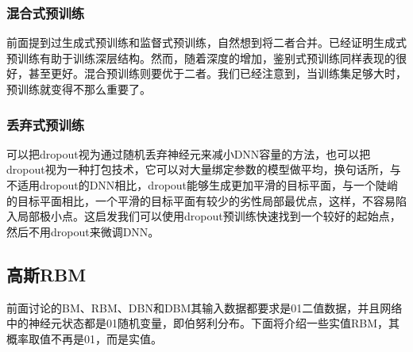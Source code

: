         \subsubsection{混合式预训练}
            \par
            前面提到过生成式预训练和监督式预训练，自然想到将二者合并。已经证明生成式预训练有助于训练深层结构。然而，随着深度的增加，鉴别式预训练同样表现的很好，甚至更好。混合预训练则要优于二者。我们已经注意到，当训练集足够大时，预训练就变得不那么重要了。
        \subsubsection{丢弃式预训练}
            \par
            可以把dropout视为通过随机丢弃神经元来减小DNN容量的方法，也可以把dropout视为一种打包技术，它可以对大量绑定参数的模型做平均，换句话所，与不适用dropout的DNN相比，dropout能够生成更加平滑的目标平面，与一个陡峭的目标平面相比，一个平滑的目标平面有较少的劣性局部最优点，这样，不容易陷入局部极小点。这启发我们可以使用dropout预训练快速找到一个较好的起始点，然后不用dropout来微调DNN。

    \subsection{高斯RBM}
        \par
        前面讨论的BM、RBM、DBN和DBM其输入数据都要求是01二值数据，并且网络中的神经元状态都是01随机变量，即伯努利分布。下面将介绍一些实值RBM，其概率取值不再是01，而是实值。
